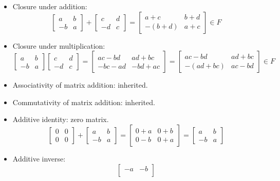 \documentclass{amsart}
\begin{document}
	\begin{itemize}
		\item Closure under addition:
		$$ \begin{bmatrix}
		a & b \\
		-b & a
		\end{bmatrix} + \begin{bmatrix}
		c & d \\
		-d & c
		\end{bmatrix} = \begin{bmatrix}
		a+c & b+d \\
		-(b+d) & a+c
		\end{bmatrix} \in F $$
		\item Closure under multiplication: 
		$$ \begin{bmatrix}
		a & b \\
		-b & a
		\end{bmatrix} \begin{bmatrix}
		c & d \\
		-d & c
		\end{bmatrix} = \begin{bmatrix}
		ac-bd & ad+bc \\
		-bc-ad & -bd+ac
		\end{bmatrix} = \begin{bmatrix}
		ac-bd & ad+bc \\
		-(ad+bc) & ac-bd
		\end{bmatrix} \in F $$
		\item Associativity of matrix addition: inherited.
		\item Commutativity of matrix addition: inherited.
		\item Additive identity: zero matrix.
		$$ \begin{bmatrix}
		0 & 0 \\
		0 & 0
		\end{bmatrix} +
		\begin{bmatrix}
		a & b \\
		-b & a
		\end{bmatrix} = \begin{bmatrix}
		0+a & 0+b \\
		0-b & 0+a
		\end{bmatrix} = \begin{bmatrix}
		a & b \\
		-b & a
		\end{bmatrix}$$
		\item Additive inverse:
		$$ \begin{bmatrix}
		-a & -b \\

\end{bmatrix}$$
\end{itemize}
\end{document}
